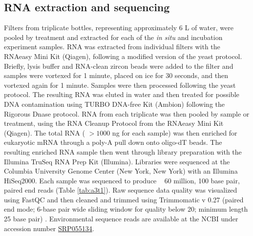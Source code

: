 \subsection{RNA extraction and sequencing}
Filters from triplicate bottles, representing approximately 6 L of water, were pooled by treatment and extracted for each of the \textit{in situ} and incubation experiment samples. RNA was extracted from individual filters with the RNAeasy Mini Kit (Qiagen), following a modified version of the yeast protocol. Briefly, lysis buffer and RNA-clean zircon beads were added to the filter and samples were vortexed for 1 minute, placed on ice for 30 seconds, and then vortexed again for 1 minute. Samples were then processed following the yeast protocol. The resulting RNA was eluted in water and then treated for possible DNA contamination using TURBO DNA-free Kit (Ambion) following the Rigorous Dnase protocol. RNA from each triplicate was then pooled by sample or treatment, using the RNA Cleanup Protocol from the RNAeasy Mini Kit (Qiagen). The total RNA ( $>1000$ ng for each sample) was then enriched for eukaryotic mRNA through a poly-A pull down onto oligo-dT beads. The resulting enriched RNA sample then went through library preparation with the Illumina TruSeq RNA Prep Kit (Illumina). Libraries were sequenced at the Columbia University Genome Center (New York, New York) with an Illumina HiSeq2000. Each sample was sequenced to produce ~ 60 million, 100 base pair, paired end reads (Table \ref{tab:a3t1}). Raw sequence data quality was visualized using FastQC \citep{Andrews} and then cleaned and trimmed using Trimmomatic v 0.27 (paired end mode; 6-base pair wide sliding window for quality below 20; minimum length 25 base pair) \citep{Lohse2012}. Environmental sequence reads are available at the NCBI under accession number \href{http://www.ncbi.nlm.nih.gov/sra/?term=SRP055134}{SRP055134}. 
